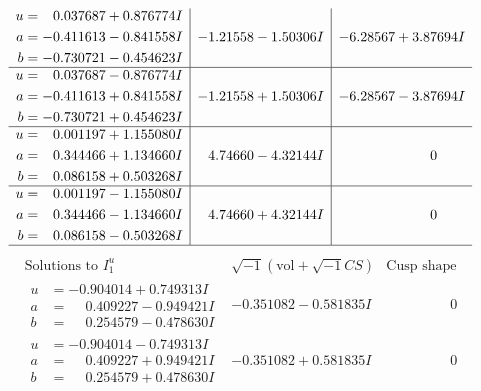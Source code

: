\documentclass[1p]{elsarticle_modified}
\theoremstyle{definition}
\newcommand{\I}{\sqrt{-1}}
\begin{document}
$$\begin{array}{c|c|c}
\begin{aligned}
u &= \phantom{-}0.037687 + 0.876774 I \\
a &= -0.411613 - 0.841558 I \\
b &= -0.730721 - 0.454623 I\end{aligned}
 & -1.21558 - 1.50306 I & -6.28567 + 3.87694 I \\ \hline\begin{aligned}
u &= \phantom{-}0.037687 - 0.876774 I \\
a &= -0.411613 + 0.841558 I \\
b &= -0.730721 + 0.454623 I\end{aligned}
 & -1.21558 + 1.50306 I & -6.28567 - 3.87694 I \\ \hline\begin{aligned}
u &= \phantom{-}0.001197 + 1.155080 I \\
a &= \phantom{-}0.344466 + 1.134660 I \\
b &= \phantom{-}0.086158 + 0.503268 I\end{aligned}
 & \phantom{-}4.74660 - 4.32144 I & \phantom{-0.000000 } 0 \\ \hline\begin{aligned}
u &= \phantom{-}0.001197 - 1.155080 I \\
a &= \phantom{-}0.344466 - 1.134660 I \\
b &= \phantom{-}0.086158 - 0.503268 I\end{aligned}
 & \phantom{-}4.74660 + 4.32144 I & \phantom{-0.000000 } 0\\
 \hline 
 \end{array}$$\newpage$$\begin{array}{c|c|c}  
\text{Solutions to }I^u_{1}& \I (\text{vol} + \sqrt{-1}CS) & \text{Cusp shape}\\
 \hline 
\begin{aligned}
u &= -0.904014 + 0.749313 I \\
a &= \phantom{-}0.409227 - 0.949421 I \\
b &= \phantom{-}0.254579 - 0.478630 I\end{aligned}
 & -0.351082 - 0.581835 I & \phantom{-0.000000 } 0 \\ \hline\begin{aligned}
u &= -0.904014 - 0.749313 I \\
a &= \phantom{-}0.409227 + 0.949421 I \\
b &= \phantom{-}0.254579 + 0.478630 I\end{aligned}
 & -0.351082 + 0.581835 I & \phantom{-0.000000 } 0 \\ \hline\begin{aligned}

\end{aligned}
\end{array}$$
\end{document}
